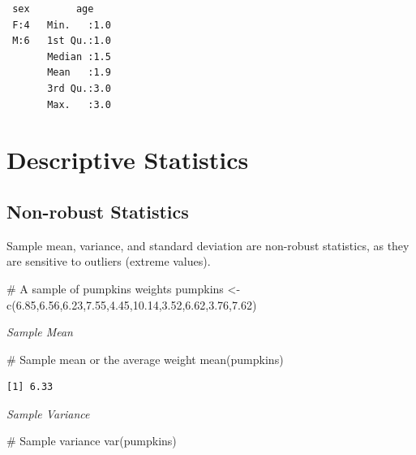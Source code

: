 \documentclass[
  letterpaper,
  DIV=11,
  numbers=noendperiod]{scrreprt}
\newenvironment{Shaded}{\begin{snugshade}}{\end{snugshade}}
\newcommand{\CommentTok}[1]{\textcolor[rgb]{0.37,0.37,0.37}{#1}}
\newcommand{\FloatTok}[1]{\textcolor[rgb]{0.68,0.00,0.00}{#1}}
\newcommand{\FunctionTok}[1]{\textcolor[rgb]{0.28,0.35,0.67}{#1}}
\newcommand{\NormalTok}[1]{\textcolor[rgb]{0.00,0.23,0.31}{#1}}
\newcommand{\OtherTok}[1]{\textcolor[rgb]{0.00,0.23,0.31}{#1}}
\begin{document}
\begin{verbatim}
 sex        age     
 F:4   Min.   :1.0  
 M:6   1st Qu.:1.0  
       Median :1.5  
       Mean   :1.9  
       3rd Qu.:3.0  
       Max.   :3.0  
\end{verbatim}

\section{Descriptive Statistics}\label{descriptive-statistics}

\subsection{Non-robust Statistics}\label{non-robust-statistics}

Sample mean, variance, and standard deviation are non-robust statistics,
as they are sensitive to outliers (extreme values).

\begin{Shaded}
\begin{Highlighting}[]
\CommentTok{\# A sample of pumpkins\textquotesingle{} weights}
\NormalTok{pumpkins }\OtherTok{\textless{}{-}} \FunctionTok{c}\NormalTok{(}\FloatTok{6.85}\NormalTok{,}\FloatTok{6.56}\NormalTok{,}\FloatTok{6.23}\NormalTok{,}\FloatTok{7.55}\NormalTok{,}\FloatTok{4.45}\NormalTok{,}\FloatTok{10.14}\NormalTok{,}\FloatTok{3.52}\NormalTok{,}\FloatTok{6.62}\NormalTok{,}\FloatTok{3.76}\NormalTok{,}\FloatTok{7.62}\NormalTok{)}
\end{Highlighting}
\end{Shaded}

\emph{Sample Mean}

\begin{Shaded}
\begin{Highlighting}[]
\CommentTok{\# Sample mean or the average weight}
\FunctionTok{mean}\NormalTok{(pumpkins)}
\end{Highlighting}
\end{Shaded}

\begin{verbatim}
[1] 6.33
\end{verbatim}

\emph{Sample Variance}

\begin{Shaded}
\begin{Highlighting}[]
\CommentTok{\# Sample variance}
\FunctionTok{var}\NormalTok{(pumpkins)}
\end{Highlighting}
\end{Shaded}
\end{document}

